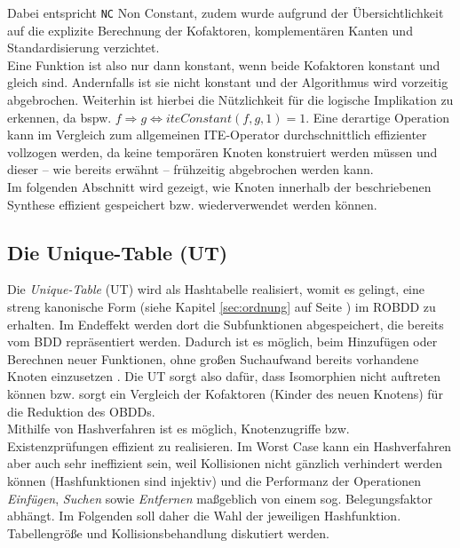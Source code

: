 Dabei entspricht \texttt{NC} \glqq Non Constant\grqq{}, zudem wurde aufgrund der Übersichtlichkeit auf die explizite Berechnung der Kofaktoren, komplementären Kanten und Standardisierung verzichtet.\\
Eine Funktion ist also nur dann konstant, wenn beide Kofaktoren konstant und gleich sind. Andernfalls ist sie nicht konstant und der Algorithmus wird vorzeitig abgebrochen. Weiterhin ist hierbei die Nützlichkeit für die logische Implikation zu erkennen, da bspw. $f \Rightarrow g \Leftrightarrow iteConstant(f, g, 1) = 1$. Eine derartige Operation kann im Vergleich zum allgemeinen ITE-Operator durchschnittlich effizienter vollzogen werden, da keine temporären Knoten konstruiert werden müssen und dieser -- wie bereits erwähnt -- frühzeitig abgebrochen werden kann.\\
Im folgenden Abschnitt wird gezeigt, wie Knoten innerhalb der beschriebenen Synthese effizient gespeichert bzw. wiederverwendet werden können.

\subsection{Die Unique-Table (UT)}
\label{sec:utable}
Die \emph{Unique-Table} (UT) wird als Hashtabelle realisiert, womit es gelingt, eine streng kanonische Form (siehe Kapitel \ref{sec:ordnung} auf Seite \pageref{sec:ordnung}) im ROBDD zu erhalten. Im Endeffekt werden dort die Subfunktionen abgespeichert, die bereits vom BDD repräsentiert werden. Dadurch ist es möglich, beim Hinzufügen oder Berechnen neuer Funktionen, ohne großen Suchaufwand bereits vorhandene Knoten einzusetzen \cite{h2011}. Die UT sorgt also dafür, dass Isomorphien nicht auftreten können bzw. sorgt ein Vergleich der Kofaktoren (Kinder des neuen Knotens) für die Reduktion des OBDDs.\\
Mithilfe von Hashverfahren ist es möglich, Knotenzugriffe bzw. Existenzprüfungen effizient zu realisieren. Im Worst Case kann ein Hashverfahren aber auch sehr ineffizient sein, weil Kollisionen nicht gänzlich verhindert werden können (Hashfunktionen sind injektiv) und die Performanz der Operationen \emph{Einfügen}, \emph{Suchen} sowie \emph{Entfernen} maßgeblich von einem sog. Belegungsfaktor abhängt. Im Folgenden soll daher die Wahl der jeweiligen Hashfunktion. Tabellengröße und Kollisionsbehandlung diskutiert werden.


